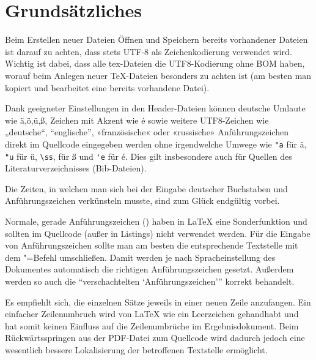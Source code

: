 \section[Grundsätzliches]{Grundsätzliches}%
\label{sec:Grundsätzliches}
%
Beim Erstellen neuer Dateien \bzw Öffnen und Speichern bereits vorhandener Dateien ist darauf zu achten,
dass stets UTF-8 als Zeichenkodierung verwendet wird.
Wichtig ist dabei, dass alle tex-Dateien die UTF8-Kodierung ohne BOM haben,
worauf beim Anlegen neuer TeX-Dateien besonders zu achten ist
(am besten man kopiert und bearbeitet eine bereits vorhandene Datei).

Dank geeigneter Einstellungen in den Header-Dateien können deutsche Umlaute wie 
%
ä,ö,ü,ß, Zeichen mit Akzent wie é sowie weitere UTF8-Zeichen wie \zB
{}%
%
„deutsche“, “englische”, »französische« oder «russische» Anführungszeichen 
direkt im Quellcode eingegeben werden ohne irgendwelche Umwege wie \zB 
\verb+"a+ für ä,
\verb+"u+ für ü,
\verb+\ss+, für ß und
\verb+'e+ für é.
Dies gilt insbesondere auch für Quellen des Literaturverzeichnisses (Bib-Dateien).

Die Zeiten, in welchen man sich bei der Eingabe deutscher Buchstaben und Anführungszeichen verkünsteln musste,
sind zum Glück endgültig vorbei.

Normale, gerade Anführungszeichen (\texttt{{\dq}}) haben in \LaTeX{} eine Sonderfunktion und sollten im Quellcode (außer in Listings) nicht verwendet werden.
Für die Eingabe von Anführungszeichen sollte man am besten die entsprechende Textstelle mit dem "=Befehl umschließen.
Damit werden je nach Spracheinstellung des Dokumentes automatisch die richtigen Anführungszeichen gesetzt.
Außerdem werden so auch die \enquote{verschachtelten \enquote{Anführungszeichen}} korrekt behandelt.

Es empfiehlt sich, die einzelnen Sätze jeweils in einer neuen Zeile anzufangen.
Ein einfacher Zeilenumbruch wird von LaTeX wie ein Leerzeichen gehandhabt
und hat somit keinen Einfluss auf die Zeilenumbrüche im Ergebnisdokument.
Beim Rückwärtsspringen aus der PDF-Datei zum Quellcode wird dadurch jedoch
eine wesentlich bessere Lokalisierung der betroffenen Textstelle ermöglicht.